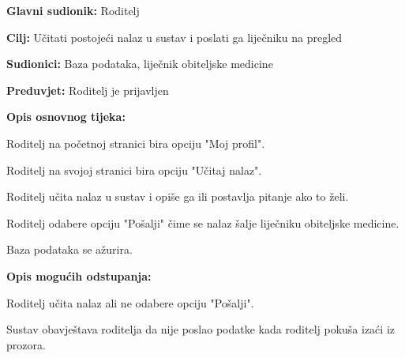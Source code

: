 					\noindent {}
					\begin{packed_item}
						
						\item \textbf{Glavni sudionik: }Roditelj
						\item  \textbf{Cilj:} Učitati postojeći nalaz u sustav i poslati ga liječniku na pregled
						\item  \textbf{Sudionici:} Baza podataka, liječnik obiteljske medicine
						\item  \textbf{Preduvjet:} Roditelj je prijavljen
						\item  \textbf{Opis osnovnog tijeka:}
						
						\item[] \begin{packed_enum}
							
							\item Roditelj na početnoj stranici bira opciju "Moj profil".
							\item Roditelj na svojoj stranici bira opciju "Učitaj nalaz".
							\item Roditelj učita nalaz u sustav i opiše ga ili postavlja pitanje ako to želi.
							\item Roditelj odabere opciju "Pošalji" čime se nalaz šalje liječniku obiteljske medicine.
							\item Baza podataka se ažurira.
						\end{packed_enum}
						
						\item  \textbf{Opis mogućih odstupanja:}
						
						\item[] \begin{packed_item}
							
							\item[4.a] Roditelj učita nalaz ali ne odabere opciju "Pošalji".
							\item[] \begin{packed_enum}
								
								\item Sustav obavještava roditelja da nije poslao podatke kada roditelj pokuša izaći iz prozora.
							\end{packed_enum}
							
							
						\end{packed_item}
					\end{packed_item}
					
